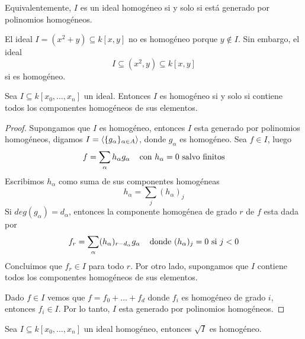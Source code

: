 \documentclass[11pt]{article}
\begin{document}
\noindent Equivalentemente, $I$ es un ideal homogéneo si y solo si está generado por polinomios
homogéneos.

\begin{ejm}
    El ideal $I=(x^{2}+y)\subseteq k[x,y]$ no es homogéneo porque $y\not\in I$. Sin embargo, el 
    ideal
    \begin{equation*}
        I\subseteq (x^{2},y)\subseteq k[x,y]
    \end{equation*}
    si es homogéneo. 
\end{ejm}

\newpage
\begin{prop}
    Sea $I\subseteq k[x_{0},\dots,x_{n}]$ un ideal. Entonces $I$ es homogéneo si y solo si 
    contiene todos los componentes homogéneos de sus elementos.
\end{prop}

\begin{proof}
    Supongamos que $I$ es homogéneo, entonces $I$ esta generado por polinomios homogéneos, digamos
    $I=\left\langle{\{g_{\alpha}\}_{\alpha\in A}}\right\rangle$, donde $g_{\alpha}$ es homogéneo. Sea $f\in I$, luego
    \begin{equation*}
        f=\sum_{\alpha}h_{\alpha}g_{\alpha} \hspace{4mm}\text{con } h_{\alpha}=0 \text{ salvo finitos}
    \end{equation*}
    Escribimos $h_{\alpha}$ como suma de sus componentes homogéneas
    \begin{equation*}
        h_{\alpha}=\sum_{j}(h_{\alpha})_{j}
    \end{equation*}
    Si $deg(g_{\alpha})=d_{\alpha}$, entonces la componente homogénea de grado $r$ de $f$ esta 
    dada por
    \begin{equation*}
        f_{r}=\sum_{\alpha}(h_{\alpha})_{r-d_{\alpha}}g_{\alpha}
        \hspace{4mm}\text{donde } (h_{\alpha})_{j}=0 \text{ si } j<0
    \end{equation*}
    Concluimos que $f_{r}\in I$ para todo $r$. Por otro lado, supongamos que $I$ contiene todos
    los componentes homogéneos de sus elementos. 
    
    \vspace{1mm}
    Dado $f\in I$ vemos que $f=f_{0}+\dots+f_{d}$ donde $f_{i}$ es homogéneo de grado $i$, 
    entonces $f_{i}\in I$. Por lo tanto, $I$ esta generado por polinomios homogéneos.
\end{proof}

\begin{lema}
    Sea $I\subseteq k[x_{0},\dots,x_{n}]$ un ideal homogéneo, entonces $\sqrt{I}$ es homogéneo.
\end{lema}
\end{document}
